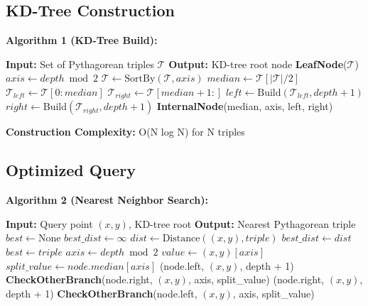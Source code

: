\documentclass{article}
\begin{document}
\subsection{KD-Tree Construction}

\textbf{Algorithm 1 (KD-Tree Build):}
\begin{algorithmic}[1]
\State \textbf{Input:} Set of Pythagorean triples $\mathcal{T}$
\State \textbf{Output:} KD-tree root node
        \State \Return \textbf{LeafNode}($\mathcal{T}$)
    \EndIf
    \State $axis \leftarrow depth \bmod 2$ 
    \State $\mathcal{T} \leftarrow \text{SortBy}(\mathcal{T}, axis)$
    \State $median \leftarrow \mathcal{T}[|\mathcal{T}|/2]$
    \State $\mathcal{T}_{left} \leftarrow \mathcal{T}[0:median]$
    \State $\mathcal{T}_{right} \leftarrow \mathcal{T}[median+1:]$
    \State $left \leftarrow \text{Build}(\mathcal{T}_{left}, depth + 1)$
    \State $right \leftarrow \text{Build}(\mathcal{T}_{right}, depth + 1)$
    \State \Return \textbf{InternalNode}(median, axis, left, right)
\EndFunction
\end{algorithmic}

\textbf{Construction Complexity:} O(N log N) for N triples

\subsection{Optimized Query}

\textbf{Algorithm 2 (Nearest Neighbor Search):}
\begin{algorithmic}[1]
\State \textbf{Input:} Query point $(x, y)$, KD-tree root
\State \textbf{Output:} Nearest Pythagorean triple
\State $best \leftarrow \text{None}$
\State $best\_dist \leftarrow \infty$
            \State $dist \leftarrow \text{Distance}((x, y), triple)$
                \State $best\_dist \leftarrow dist$
                \State $best \leftarrow triple$
            \EndIf
        \EndFor
    \Else
        \State $axis \leftarrow depth \bmod 2$
        \State $value \leftarrow (x, y)[axis]$
        \State $split\_value \leftarrow node.median[axis]$
            \State {}(node.left, $(x, y)$, depth + 1)
            \State \textbf{CheckOtherBranch}(node.right, $(x, y)$, axis, split\_value)
        \Else
            \State {}(node.right, $(x, y)$, depth + 1)
            \State \textbf{CheckOtherBranch}(node.left, $(x, y)$, axis, split\_value)
        \EndIf
    \EndIf
\EndFunction
\end{algorithmic}
\end{document}
